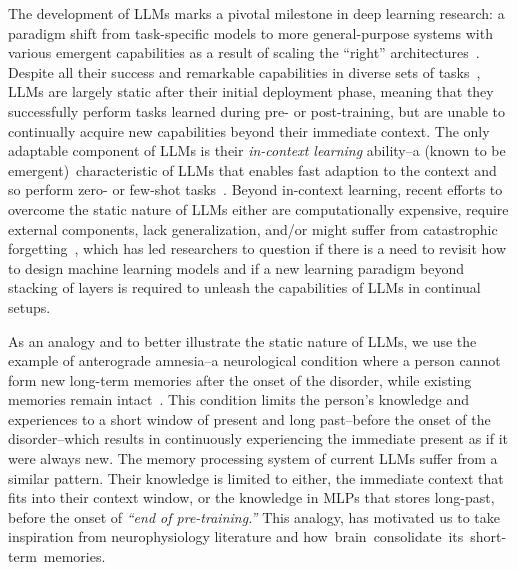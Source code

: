 \documentclass{article}
\newcommand{\citep}{\parencite}
\newcommand{\head}[1]{\vspace{1.7mm}\noindent{{\textcolor{c4}{\bf #1.}}}}
\begin{document}
The development of LLMs marks a pivotal milestone in deep learning research: a paradigm shift from task-specific models to more general-purpose systems with various emergent capabilities as a result of scaling the ``right'' architectures~\citep{brown2020language, schaeffer2023emergent}. Despite all their success and remarkable capabilities in diverse sets of tasks~\citep{comanici2025gemini, nijkamp2023codegen, wang2023visionllm}, LLMs are largely static after their initial deployment phase, meaning that they successfully perform tasks learned during pre- or post-training, but are unable to continually acquire new capabilities beyond their immediate context. The only adaptable component of LLMs is their \emph{in-context learning} ability–a (known to be emergent)~characteristic of LLMs that enables fast adaption to the context and so perform zero- or few-shot tasks~\citep{brown2020language}. Beyond in-context learning, recent efforts to overcome the static nature of LLMs either are computationally expensive, require external components, lack generalization, and/or might suffer from catastrophic forgetting~\citep{eyuboglu2025cartridges, yu2025finemedlmo, akyureksurprising}, which has led researchers to question if there is a need to revisit how to design machine learning models and if a new learning paradigm beyond stacking of layers is required to unleash the capabilities of LLMs in continual setups. 

\head{Current Models only Experience the Immediate Present}
As an analogy and to better illustrate the static nature of LLMs, we use the example of anterograde amnesia–a neurological condition where a person cannot form new long-term memories after the onset of the disorder, while existing memories remain intact~\citep{scoville1957loss}. This condition limits the person's knowledge and experiences to a short window of present and long past–before the onset of the disorder–which results in continuously experiencing the immediate present as if it were always new. The memory processing system of current LLMs suffer from a similar pattern. Their knowledge is limited to either, the immediate context that fits into their context window, or the knowledge in MLPs that stores long-past, before the onset of \emph{``end of pre-training.''} This analogy, has motivated us to take inspiration from neurophysiology literature and how~brain~consolidate~its~short-term~memories.

 
\end{document}
